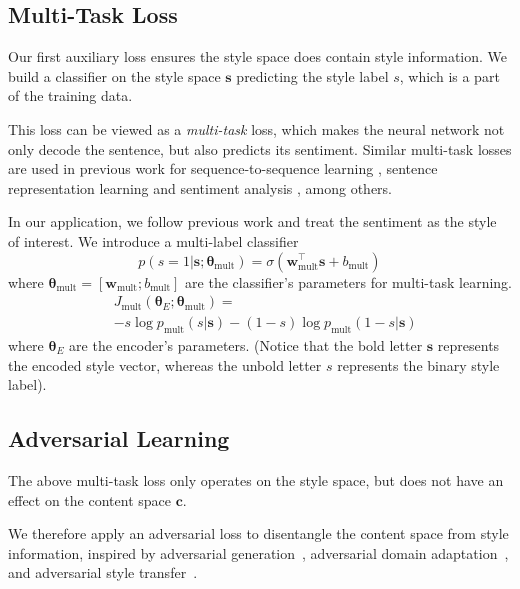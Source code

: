 \documentclass[11pt,a4paper]{article}
\newcommand{\loss}[1]{J_\text{#1}}
\begin{document}
\subsection{Multi-Task Loss} \label{ss:multi}

Our first auxiliary loss ensures the style space does contain style information. We build a classifier on the style space $\bm s$ predicting the style label $s$, which is a part of the training data.

This loss can be viewed as a \textit{multi-task} loss, which makes the neural network not only decode the sentence, but also predicts its sentiment. Similar multi-task losses are used in previous work for sequence-to-sequence learning \cite{luong2015multi}, sentence representation learning \cite{jernite2017discourse} and sentiment analysis \cite{balikas2017multitask}, among others.

In our application, we follow previous work \cite{hu2017toward,shen2017style,fu2017style} and treat the sentiment as the style of interest. We introduce a multi-label classifier
\begin{equation}
	p(s=1|\bm s;\bm\theta_\text{mult})=\sigma(\bm w_\text{mult}^\top \bm s + b_\text{mult})
\end{equation}
where $\bm\theta_\text{mult}=[\bm w_\text{mult}; b_\text{mult}]$ are the classifier's parameters for multi-task learning.
\begin{align} \label{eqn:Jmult}
	 & \loss{mult}(\bm\theta_{E};\bm\theta_\text{mult})=                  \\ \nonumber
	 & -s\log p_\text{mult}(s|\bm s) - (1-s)\log p_\text{mult}(1-s|\bm s)
\end{align}
where $\bm\theta_E$ are the encoder's parameters. (Notice that the bold letter $\bm s$ represents the encoded style vector, whereas the unbold letter $s$ represents the binary style label).


\subsection{Adversarial Learning} \label{ss:adv}

The above multi-task loss only operates on the style space, but does not have an effect on the content space $\bm c$.

We therefore apply an adversarial loss to disentangle the content space from style information, inspired by adversarial generation~\cite{goodfellow2014generative}, adversarial domain adaptation~\cite{liu2017adversarial}, and adversarial style transfer~\cite{fu2017style}.
\end{document}
